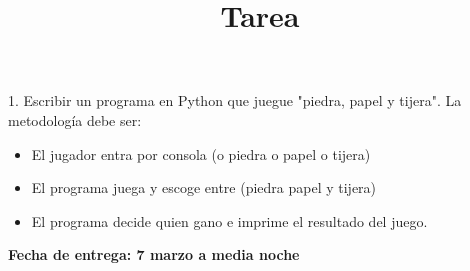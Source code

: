 \documentclass[12pt]{article}
\title{Tarea}
\begin{document}
\maketitle

1. Escribir un programa en Python que juegue "piedra, papel y tijera". La metodolog\'ia debe ser:

\begin{itemize}
\item El jugador entra por consola (o piedra o papel o tijera)
\item El programa juega y escoge entre (piedra papel y tijera)
\item El programa decide quien gano e imprime el resultado del juego.
\end{itemize}

\textbf{Fecha de entrega: 7 marzo a media noche}
\end{document}

